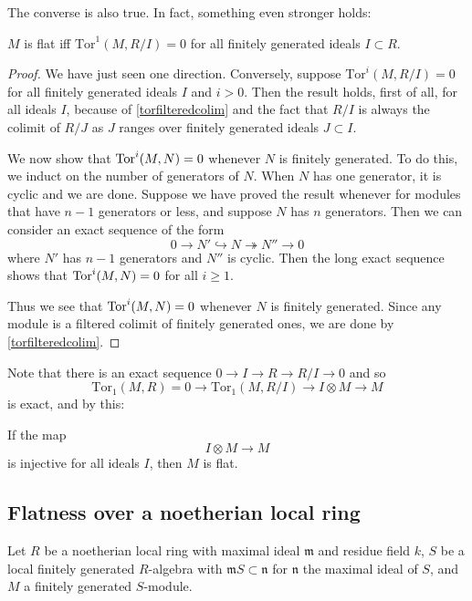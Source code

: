 The converse is also true. In fact, something even stronger holds:
\begin{proposition} $M$ is flat iff $\mathrm{Tor} ^1(M,R/I)=0$ for all finitely generated ideals $I \subset R$.
\end{proposition}
\begin{proof}
We have just seen one direction. 
Conversely, suppose $\mathrm{Tor} ^i(M,R/I) = 0$ for all finitely generated
ideals $I$ and $i>0$. 
Then the result holds, first of all, for all ideals $I$, because of
\cref{torfilteredcolim} and the fact that $R/I$ is always the colimit of $R/J$
as $J$ ranges over finitely generated ideals $J \subset I$.

We now show that $\operatorname{Tor}^i(M, N) = 0$ whenever $N$ is finitely generated. To do
this, we induct on the number of generators of $N$. When $N$ has one
generator, it is cyclic and we are done. Suppose we have proved the result
whenever for modules that have $n-1$ generators or less, and suppose $N$ has
$n$ generators.
Then we can consider an exact sequence of the form
\[ 0 \to N' \hookrightarrow N \twoheadrightarrow N'' \to 0  \]
where $N'$ has $n-1$ generators and $N''$ is cyclic. Then the long exact
sequence shows that $\operatorname{Tor}^i(M, N) = 0$ for all $i \geq 1$.

Thus we see that $\operatorname{Tor}^i(M, N)  = 0$ whenever $N$ is finitely generated. Since
any module is a filtered colimit of finitely generated ones, we are done by
\cref{torfilteredcolim}.
\end{proof}


Note that there is an exact sequence $0 \to I \to R \to R/I \to 0$ and
so
\[ \mathrm{Tor} _1(M,R)=0 \to \mathrm{Tor} _1(M,R/I) \to I \otimes M \to M \]
is exact, and by this:

\begin{corollary} 
If the map
\[ I \otimes M \to M \]
is injective for all ideals $I$, then $M$ is flat.
\end{corollary} 

\subsection{Flatness over a noetherian local ring}

Let $R$ be a noetherian local ring with maximal ideal $\mathfrak{m}$ and residue field $k$, $S$ be a local finitely generated $R$-algebra with $\mathfrak{m}S \subset \mathfrak{n}$ for $\mathfrak{n}$ the maximal ideal of $S$, and $M$ a finitely generated $S$-module.

